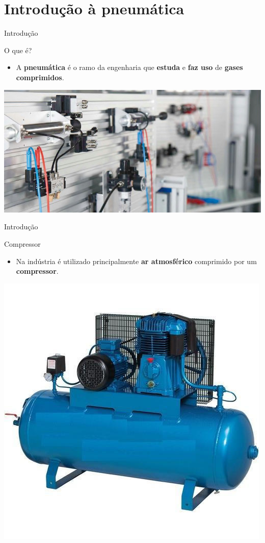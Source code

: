 \section{Introdução à pneumática}

\begin{frame}{Introdução}
\begin{block}{O que é?}
	\begin{itemize}
		\item A \textbf{pneumática} é o ramo da engenharia que \textbf{estuda} e \textbf{faz uso }de \textbf{gases comprimidos}.
	\end{itemize}
\end{block}

\vspace{0.2cm}

\centering
\includegraphics[width=0.9\linewidth]{Figuras/Ch11/fig1}

\end{frame}


\begin{frame}{Introdução}
\begin{block}{Compressor}
	\begin{itemize}
		\item Na indústria é utilizado principalmente \textbf{ar atmosférico} comprimido por um \textbf{compressor}.
	\end{itemize}
\end{block}

\centering
\includegraphics[width=0.5\linewidth]{Figuras/Ch11/fig2}

\end{frame}


